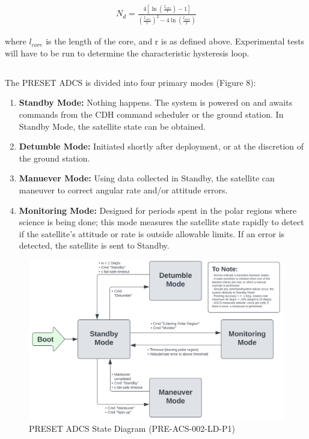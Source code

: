 \documentclass{article}
\begin{document}
\begin{align}
    N_{d} = \frac{4 \left[ \ln{(\frac{l_{core}}{r})} -1 \right]}{(\frac{l_{core}}{r})^2 - 4 \ln{(\frac{l_{core}}{r})}} \tag{4.7}
\end{align}

\noindent where $l_{core}$ is the length of the core, and r is as defined above. Experimental tests will have to be run to determine the characteristic hysteresis loop. 

\subsection{\color{black}{PRESET ADCS Algorithms}}

\subsubsection{\color{black}{ADCS Modes}}

The PRESET ADCS is divided into four primary modes (Figure 8):

\begin{enumerate}
    \item \textbf{Standby Mode:} Nothing happens. The system is powered on and awaits commands from the CDH command scheduler or the ground station. In Standby Mode, the satellite state can be obtained.
    \item \textbf{Detumble Mode:} Initiated shortly after deployment, or at the discretion of the ground station. 
    \item \textbf{Manuever Mode:} Using data collected in Standby, the satellite can maneuver to correct angular rate and/or attitude errors.
    \item \textbf{Monitoring Mode:} Designed for periods spent in the polar regions where science is being done; this mode measures the satellite state rapidly to detect if the satellite's attitude or rate is outside allowable limits. If an error is detected, the satellite is sent to Standby.
\end{enumerate}

\begin{figure}[H]
    \centering
    \includegraphics[width=1\textwidth]{R7.png}
    \caption{PRESET ADCS State Diagram (PRE-ACS-002-LD-P1)}
    \label{fig:enter-label}
\end{figure}

\newpage
 
 
 
\end{document}
